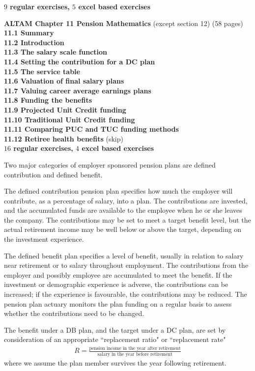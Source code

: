 \documentclass[hidelinks, 12pt]{article}
\theoremstyle{mydefstyle}
\theoremstyle{mythmstyle}
\newcounter{prop}
\begin{document}
\textbf{$9$ regular exercises, $5$ excel based exercises}

\textbf{ALTAM Chapter 11 Pension Mathematics} (except section 12) (58 pages) \\
\textbf{11.1 Summary} \\
\textbf{11.2 Introduction} \\
\textbf{11.3 The salary scale function} \\
\textbf{11.4 Setting the contribution for a DC plan} \\
\textbf{11.5 The service table} \\
\textbf{11.6 Valuation of final salary plans} \\
\textbf{11.7 Valuing career average earnings plans} \\
\textbf{11.8 Funding the benefits} \\
\textbf{11.9 Projected Unit Credit funding} \\
\textbf{11.10 Traditional Unit Credit funding} \\
\textbf{11.11 Comparing PUC and TUC funding methods} \\
\textbf{11.12 Retiree health benefits} (skip) \\
\textbf{$16$ regular exercises, $4$ excel based exercises}

Two major categories of employer sponsored pension plans are defined contribution and defined benefit.

The defined contribution pension plan specifies how much the employer will contribute, as a percentage of salary, into a plan. The contributions are invested, and the accumulated funds are available to the employee when he or she leaves the company. The contributions may be set to meet a target benefit level, but the actual retirement income may be well below or above the target, depending on the investment experience.

The defined benefit plan specifies a level of benefit, usually in relation to salary near retirement or to salary throughout employment. The contributions from the employer and possibly employee are accumulated to meet the benefit. If the investment or demographic experience is adverse, the contributions can be increased; if the experience is favourable, the contributions may be reduced. The pension plan actuary monitors the plan funding on a regular basis to assess whether the contributions need to be changed. 

The benefit under a DB plan, and the target under a DC plan, are set by consideration of an appropriate ``replacement ratio" or ``replacement rate"
\begin{gather*}
R = \frac{\mbox{pension income in the year after retirement}}{\mbox{salary in the year before retirement}}
\end{gather*}
where we assume the plan member survives the year following retirement. 
\end{document}
